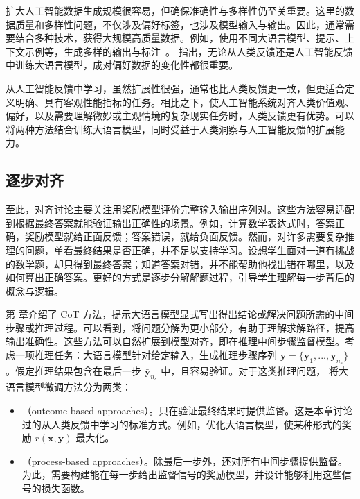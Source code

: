 扩大人工智能数据生成规模很容易，但确保准确性与多样性仍至关重要。这里的数据质量和多样性问题，不仅涉及偏好标签，也涉及模型输入与输出。因此，通常需要结合多种技术，获得大规模高质量数据。例如，使用不同大语言模型、提示、上下文示例等，生成多样的输出与标注~\cite{cui-etal:2024ultra}。\citet{dubois-etal:2024alpacafarm} 指出，无论从人类反馈还是人工智能反馈中训练大语言模型，成对偏好数据的变化性都很重要。

从人工智能反馈中学习，虽然扩展性很强，通常也比人类反馈更一致，但更适合定义明确、具有客观性能指标的任务。相比之下，使人工智能系统对齐人类价值观、偏好，以及需要理解微妙或主观情境的复杂现实任务时，人类反馈更有优势。可以将两种方法结合训练大语言模型，同时受益于人类洞察与人工智能反馈的扩展能力。

\subsection{逐步对齐}

\noindent 至此，对齐讨论主要关注用奖励模型评价完整输入输出序列对。这些方法容易适配到根据最终答案就能验证输出正确性的场景。例如，计算数学表达式时，答案正确，奖励模型就给正面反馈；答案错误，就给负面反馈。然而，对许多需要复杂推理的问题，单看最终结果是否正确，并不足以支持学习。设想学生面对一道有挑战的数学题，却只得到最终答案；知道答案对错，并不能帮助他找出错在哪里，以及如何算出正确答案。更好的方式是逐步分解解题过程，引导学生理解每一步背后的概念与逻辑。

第 \ChapterLLMPrompting 章介绍了 CoT 方法，提示大语言模型显式写出得出结论或解决问题所需的中间步骤或推理过程。可以看到，将问题分解为更小部分，有助于理解求解路径，提高输出准确性。这些方法可以自然扩展到模型对齐，即在推理中间步骤监督模型。考虑一项推理任务：大语言模型针对给定输入，生成推理步骤序列 $\mathbf{y} = \{\bar{\mathbf{y}}_1,...,\bar{\mathbf{y}}_{n_s}\}$。假定推理结果包含在最后一步 $\bar{\mathbf{y}}_{n_s}$ 中，且容易验证。对于这类推理问题，\citet{uesato-etal:2022solving} 将大语言模型微调方法分为两类：

\begin{itemize}
\item \vspace{0.5em} （outcome-based approaches）。只在验证最终结果时提供监督。这是本章讨论过的从人类反馈中学习的标准方式。例如，优化大语言模型，使某种形式的奖励 $r(\mathbf{x},\mathbf{y})$ 最大化。
\item \vspace{0.3em} （process-based approaches）。除最后一步外，还对所有中间步骤提供监督。为此，需要构建能在每一步给出监督信号的奖励模型，并设计能够利用这些信号的损失函数。
\end{itemize}
\vspace{0.5em}

